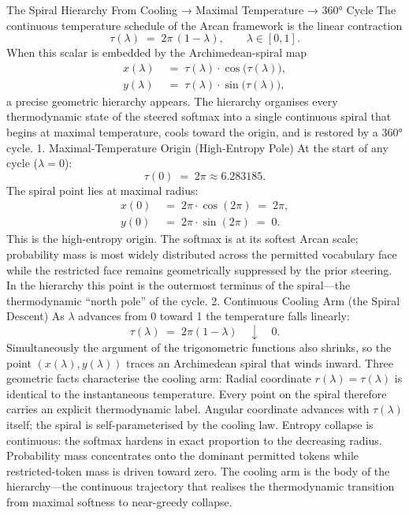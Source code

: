 The Spiral Hierarchy
From Cooling → Maximal Temperature → 360° Cycle
The continuous temperature schedule of the Arcan framework is the linear contraction
\[
\tau(\lambda)\;=\;2\pi\,(1-\lambda),\qquad\lambda\in[0,1].
\]
When this scalar is embedded by the Archimedean-spiral map
\[
\begin{align*}
x(\lambda)&\;=\;\tau(\lambda)\cdot\cos\bigl(\tau(\lambda)\bigr),\\
y(\lambda)&\;=\;\tau(\lambda)\cdot\sin\bigl(\tau(\lambda)\bigr),
\end{align*}
\]
a precise geometric hierarchy appears. The hierarchy organises every thermodynamic state of the steered softmax into a single continuous spiral that begins at maximal temperature, cools toward the origin, and is restored by a 360° cycle.
1. Maximal-Temperature Origin (High-Entropy Pole)
At the start of any cycle (\(\lambda=0\)):
\[
\tau(0)\;=\;2\pi\approx6.283185.
\]
The spiral point lies at maximal radius:
\[
\begin{align*}
x(0)&\;=\;2\pi\cdot\cos(2\pi)\;=\;2\pi,\\
y(0)&\;=\;2\pi\cdot\sin(2\pi)\;=\;0.
\end{align*}
\]
This is the high-entropy origin. The softmax is at its softest Arcan scale; probability mass is most widely distributed across the permitted vocabulary face while the restricted face remains geometrically suppressed by the prior steering. In the hierarchy this point is the outermost terminus of the spiral—the thermodynamic “north pole” of the cycle.
2. Continuous Cooling Arm (the Spiral Descent)
As \(\lambda\) advances from 0 toward 1 the temperature falls linearly:
\[
\tau(\lambda)\;=\;2\pi(1-\lambda)\quad\downarrow\quad0.
\]
Simultaneously the argument of the trigonometric functions also shrinks, so the point \((x(\lambda),y(\lambda))\) traces an Archimedean spiral that winds inward. Three geometric facts characterise the cooling arm:
Radial coordinate \(r(\lambda)=\tau(\lambda)\) is identical to the instantaneous temperature. Every point on the spiral therefore carries an explicit thermodynamic label.
Angular coordinate advances with \(\tau(\lambda)\) itself; the spiral is self-parameterised by the cooling law.
Entropy collapse is continuous: the softmax hardens in exact proportion to the decreasing radius. Probability mass concentrates onto the dominant permitted tokens while restricted-token mass is driven toward zero.
The cooling arm is the body of the hierarchy—the continuous trajectory that realises the thermodynamic transition from maximal softness to near-greedy collapse.
